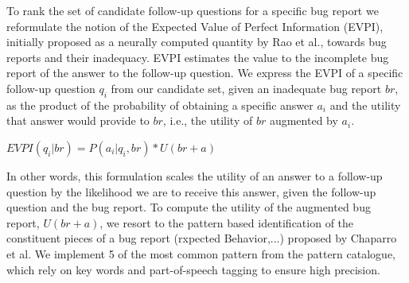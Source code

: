 To rank the set of candidate follow-up questions for a specific bug report we reformulate
the notion of the Expected Value of Perfect Information (EVPI), initially proposed as a
neurally computed quantity by Rao et al., towards bug reports and their inadequacy. EVPI estimates
the value to the incomplete bug report of the answer to the follow-up question. We express
the EVPI of a specific follow-up question $q_{i}$ from our candidate set, given an inadequate
bug report $br$, as the product of the probability of obtaining a specific answer $a_{i}$ and
the utility that answer would provide to $br$, i.e., the utility of $br$ augmented by $a_{i}$.

\medskip
$EVPI(q_{i}|br) = P(a_{i}|q_{i},br) * U(br+a)$
\medskip

In other words, this formulation scales the utility of an answer to a follow-up question by the
likelihood we are to receive this answer, given the follow-up question and the bug report.
To compute the utility of the augmented bug report, $U(br+a)$, we resort to the pattern based
identification of the constituent pieces of a bug report (rxpected Behavior,...) proposed by Chaparro et al.
We implement 5 of the most common pattern from the pattern catalogue, which rely on key words
and part-of-speech tagging to ensure high precision.



%
%
%
